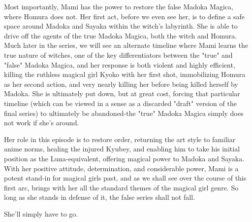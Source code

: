 Most importantly, Mami has the power to restore the false Madoka Magica, where Homura does not. Her first act, before we even see her, is to define a safe space around Madoka and Sayaka within the witch's labyrinth. She is able to drive off the agents of the true Madoka Magica, both the witch and Homura. Much later in the series, we will see an alternate timeline where Mami learns the true nature of witches, one of the key differentiators between the "true" and "false" Madoka Magica, and her response is both violent and highly efficient, killing the ruthless magical girl Kyoko with her first shot, immobilizing Homura as her second action, and very nearly killing her before being killed herself by Madoka. She is ultimately put down, but at great cost, forcing that particular timeline (which can be viewed in a sense as a discarded "draft" version of the final series) to ultimately be abandoned-the "true" Madoka Magica simply does not work if she's around. 

Her role in this episode is to restore order, returning the art style to familiar anime norms, healing the injured Kyubey, and enabling him to take his initial position as the Luna-equivalent, offering magical power to Madoka and Sayaka. With her positive attitude, determination, and considerable power, Mami is a potent stand-in for magical girls past, and as we shall see over the course of this first arc, brings with her all the standard themes of the magical girl genre. So long as she stands in defense of it, the false series shall not fall.

She'll simply have to go.
